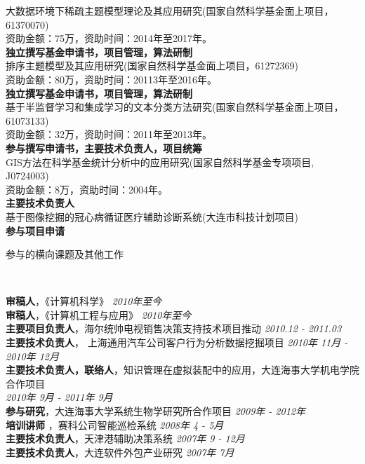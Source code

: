 \documentclass[9pt]{article}
\newenvironment{changemargin}[2]{%
  \begin{list}{}{%
    \setlength{\topsep}{0pt}%
    \setlength{\leftmargin}{#1}%
    \setlength{\rightmargin}{#2}%
    \setlength{\listparindent}{\parindent}%
    \setlength{\itemindent}{\parindent}%
    \setlength{\parsep}{\parskip}%
  }%
  \item[]}{\end{list}
}
\newcommand{\lineover}{
	\begin{changemargin}{-0.05in}{-0.05in}
		\vspace*{-8pt}
		\hrulefill \\
		\vspace*{-2pt}
	\end{changemargin}
}
\newcommand{\header}[1]{
	\begin{changemargin}{-0.5in}{-0.5in}
		\scshape{#1}\\
  	\lineover
	\end{changemargin}
}
\newenvironment{body} {
	\vspace*{-16pt}
	\begin{changemargin}{-0.25in}{-0.5in}
  }
	{\end{changemargin}
}
\begin{document}
\begin{body}
	\vspace{14pt}
	大数据环境下稀疏主题模型理论及其应用研究(国家自然科学基金面上项目，61370070)\\ 资助金额：75万，资助时间：2014年至2017年。\\
	\textbf{独立撰写基金申请书，项目管理，算法研制}\\
	\medskip
	排序主题模型及其应用研究(国家自然科学基金面上项目，61272369)\\	资助金额：80万，资助时间：20113年至2016年。\\
	\textbf{独立撰写基金申请书，项目管理，算法研制}\\
	\medskip
	基于半监督学习和集成学习的文本分类方法研究(国家自然科学基金面上项目，61073133)\\ 资助金额：32万，资助时间：2011年至2013年。\\
	\textbf{参与撰写申请书，主要技术负责人，项目统筹}\\
	\medskip
	GIS方法在科学基金统计分析中的应用研究(国家自然科学基金专项项目, J0724003)\\
	资助金额：8万，资助时间：2004年。\\
	\textbf{主要技术负责人}\\
	\medskip
	基于图像挖掘的冠心病循证医疗辅助诊断系统(大连市科技计划项目)\\
	\textbf{参与项目申请}
\end{body}

\smallskip
\medskip
\newpage

\header{\Large{参与的横向课题及其他工作}}

\begin{body}
	\vspace{14pt}
	\textbf{审稿人}，《计算机科学》 \hfill{} \emph{2010年至今}\\
	\smallskip
	\textbf{审稿人}，《计算机工程与应用》 \hfill{} \emph{2010年至今}\\
	\smallskip
	\textbf{主要项目负责人}，海尔统帅电视销售决策支持技术项目推动 \hfill{} \emph{2010.12 - 2011.03} \\
	\smallskip
	\textbf{主要技术负责人}， 上海通用汽车公司客户行为分析数据挖掘项目\hfill {} \emph{2010年 11月 - 2010年 12月}\\
	\smallskip
	\textbf{主要技术负责人，联络人}，知识管理在虚拟装配中的应用，大连海事大学机电学院合作项目 \\\hfill{}  \emph{2010年 9月 - 2011年 9月}\\
	\smallskip
	\textbf{参与研究}，大连海事大学系统生物学研究所合作项目 \hfill{} \emph{2009年 - 2012年}\\
	\smallskip
    \textbf{培训讲师}	，赛科公司智能巡检系统 \hfill{} \emph{2008年 4 - 5月}\\
    \smallskip
    \textbf{主要技术负责人}，天津港辅助决策系统 \hfill{} \emph{2007年 9 - 12月} \\
    \smallskip
    \textbf{主要技术负责人}，大连软件外包产业研究 \hfill{} \emph{2007年 7月} \\
\end{body}
\end{document}
